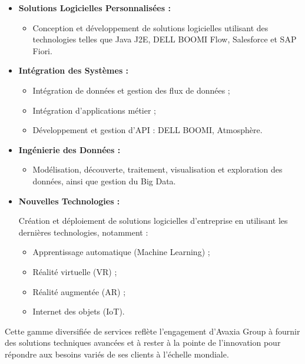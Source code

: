 \begin{itemize}
\begin{itemize}
            \end{itemize}
     \item \textbf{ Solutions Logicielles Personnalisées :}
            \begin{itemize}
                \item  Conception et développement de solutions logicielles utilisant des technologies telles que Java J2E, DELL BOOMI Flow, Salesforce et SAP Fiori.
            \end{itemize}
         \item \textbf{Intégration des Systèmes :}
            \begin{itemize}
                \item  Intégration de données et gestion des flux de données ;
                \item Intégration d'applications métier ;
                \item Développement et gestion d'API : DELL BOOMI, Atmosphère.
            \end{itemize}
    \item \textbf{Ingénierie des Données :}
            \begin{itemize}
                \item  Modélisation, découverte, traitement, visualisation et exploration des données, ainsi que gestion du Big Data.
            \end{itemize}
    \item \textbf{Nouvelles Technologies :}
            \par Création et déploiement de solutions logicielles d'entreprise en utilisant les dernières technologies, notamment :
            \begin{itemize}
                \item  Apprentissage automatique (Machine Learning) ;
                \item Réalité virtuelle (VR) ;
                \item Réalité augmentée (AR) ;
                \item Internet des objets (IoT).
            \end{itemize}
    
\end{itemize}
\par Cette gamme diversifiée de services reflète l'engagement d'Avaxia Group à fournir des solutions techniques avancées et à rester à la pointe de l'innovation pour répondre aux besoins variés de ses clients à l'échelle mondiale.



